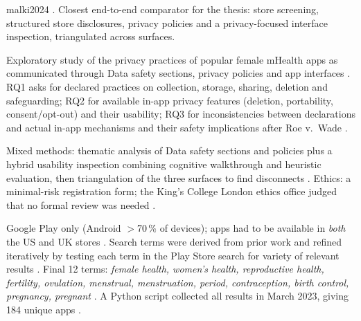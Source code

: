 \begin{papercard}{malki2024}
     . Closest end-to-end comparator for the thesis: store screening, structured store disclosures, privacy policies and a privacy-focused interface inspection, triangulated across surfaces.

 Exploratory study of the privacy practices of popular female mHealth apps as communicated through Data safety sections, privacy policies and app interfaces . RQ1 asks for declared practices on collection, storage, sharing, deletion and safeguarding; RQ2 for available in-app privacy features (deletion, portability, consent/opt-out) and their usability; RQ3 for inconsistencies between declarations and actual in-app mechanisms and their safety implications after Roe v.\ Wade .

 Mixed methods: thematic analysis of Data safety sections and policies plus a hybrid usability inspection combining cognitive walkthrough and heuristic evaluation, then triangulation of the three surfaces to find disconnects . Ethics: a minimal-risk registration form; the King's College London ethics office judged that no formal review was needed .

 Google Play only (Android $>$70\,\% of devices); apps had to be available in \emph{both} the US and UK stores . Search terms were derived from prior work and refined iteratively by testing each term in the Play Store search for variety of relevant results . Final 12 terms: \emph{female health, women's health, reproductive health, fertility, ovulation, menstrual, menstruation, period, contraception, birth control, pregnancy, pregnant} . A Python script collected all results in March 2023, giving 184 unique apps .


\end{papercard}
